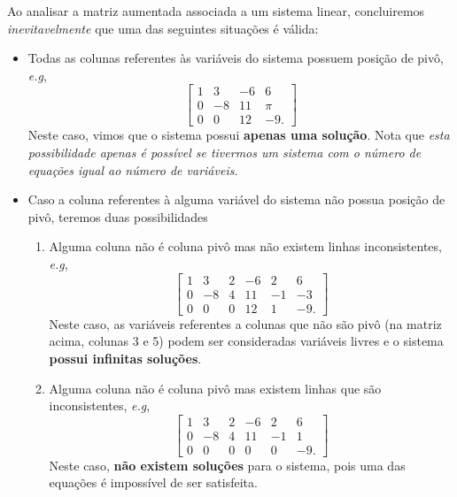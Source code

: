Ao analisar a matriz aumentada associada a um sistema linear, concluiremos \textit{inevitavelmente} que uma das seguintes situações é válida:
\begin{itemize}
  \item Todas as colunas referentes às variáveis do sistema possuem posição de pivô, \emph{e.g},
\begin{equation}
\left[
  \begin{array}{ccc|c}
    1 &  3 & -6 &  6  \\
    0 & -8 & 11 & \pi  \\
    0 & 0 & 12 & -9.
  \end{array}
\right]
\end{equation} Neste caso, vimos que o sistema possui \textbf{apenas uma solução}. Nota que \textit{esta possibilidade apenas é possível se tivermos um sistema com o número de equações igual ao número de variáveis}.
  \item Caso a coluna referentes à alguma variável do sistema não possua posição de pivô, teremos duas possibilidades
\begin{enumerate}[$(i)$]
  \item Alguma coluna não é coluna pivô mas não existem linhas inconsistentes, \emph{e.g},
\begin{equation}
\left[
  \begin{array}{ccccc|c}
    1 & 3  & 2  & -6 & 2  &  6  \\
    0 & -8 & 4 & 11  & -1  & -3  \\
    0 & 0  &  0 & 12 &  1 & -9.
  \end{array}
\right]
\end{equation} Neste caso, as variáveis referentes a colunas que não são pivô (na matriz acima, colunas 3 e 5) podem ser consideradas variáveis livres e o sistema \textbf{possui infinitas soluções}.

  \item Alguma coluna não é coluna pivô mas existem linhas que são inconsistentes, \emph{e.g},
\begin{equation}
\left[
  \begin{array}{ccccc|c}
    1 & 3  & 2  & -6 & 2  &  6  \\
    0 & -8 & 4 & 11  & -1  & 1  \\
    0 & 0  &  0 & 0 &  0 & -9.
  \end{array}
\right]
\end{equation} Neste caso, \textbf{não existem soluções} para o sistema, pois uma das equações é impossível de ser satisfeita.
\end{enumerate}
\end{itemize}


